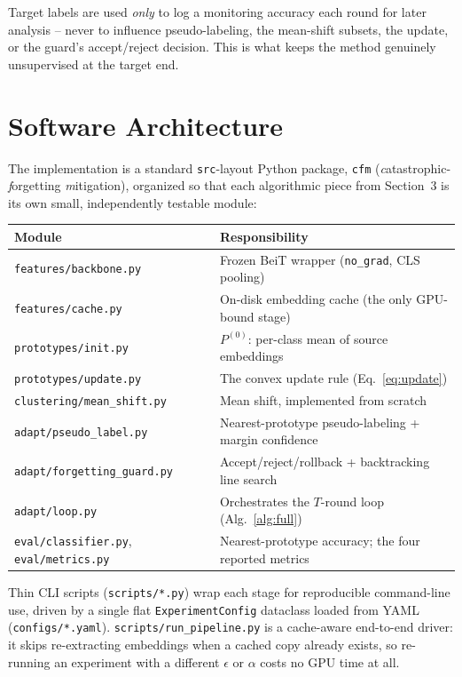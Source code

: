 \documentclass[11pt]{article}
\begin{document}
Target labels are used \emph{only} to log a monitoring accuracy each round for later analysis --
never to influence pseudo-labeling, the mean-shift subsets, the update, or the guard's
accept/reject decision. This is what keeps the method genuinely unsupervised at the target end.

\section{Software Architecture}

The implementation is a standard \texttt{src}-layout Python package, \texttt{cfm}
(\emph{c}atastrophic-\emph{f}orgetting \emph{m}itigation), organized so that each algorithmic
piece from Section~3 is its own small, independently testable module:

\begin{center}
\begin{tabular}{@{}l p{8.6cm}@{}}
\toprule
\textbf{Module} & \textbf{Responsibility} \\
\midrule
\texttt{features/backbone.py} & Frozen BeiT wrapper (\texttt{no\_grad}, CLS pooling) \\
\texttt{features/cache.py} & On-disk embedding cache (the only GPU-bound stage) \\
\texttt{prototypes/init.py} & $P^{(0)}$: per-class mean of source embeddings \\
\texttt{prototypes/update.py} & The convex update rule (Eq.~\ref{eq:update}) \\
\texttt{clustering/mean\_shift.py} & Mean shift, implemented from scratch \\
\texttt{adapt/pseudo\_label.py} & Nearest-prototype pseudo-labeling + margin confidence \\
\texttt{adapt/forgetting\_guard.py} & Accept/reject/rollback + backtracking line search \\
\texttt{adapt/loop.py} & Orchestrates the $T$-round loop (Alg.~\ref{alg:full}) \\
\texttt{eval/classifier.py}, \texttt{eval/metrics.py} & Nearest-prototype accuracy; the four reported metrics \\
\bottomrule
\end{tabular}
\end{center}

Thin CLI scripts (\texttt{scripts/*.py}) wrap each stage for reproducible command-line use,
driven by a single flat \texttt{ExperimentConfig} dataclass loaded from YAML
(\texttt{configs/*.yaml}). \texttt{scripts/run\_pipeline.py} is a cache-aware end-to-end driver:
it skips re-extracting embeddings when a cached copy already exists, so re-running an experiment
with a different $\epsilon$ or $\alpha$ costs no GPU time at all.
\end{document}
